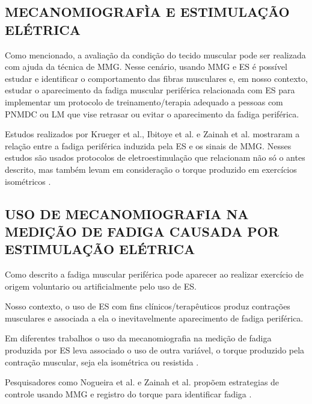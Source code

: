 \subsection{MECANOMIOGRAFÌA E ESTIMULAÇÃO ELÉTRICA}
Como mencionado, a avaliação da condição do tecido muscular pode ser realizada com ajuda da técnica de \acrshort{MMG}. Nesse cenário, usando \acrshort{MMG} e \acrshort{ES} é possível estudar e identificar o comportamento das fibras musculares \cite{Krueger2014AdvancesMechanomyography} e, em nosso contexto, estudar o aparecimento da fadiga muscular periférica relacionada com \acrshort{ES} para implementar um protocolo de treinamento/terapia adequado a pessoas com \acrshort{PNMDC} ou \acrshort{LM} que vise retrasar ou evitar o aparecimento da fadiga periférica. 

Estudos realizados por Krueger et al., Ibitoye et al. e Zainah et al. mostraram a relação entre a fadiga periférica induzida pela \acrshort{ES} e os sinais de \acrshort{MMG}. Nesses estudos são usados protocolos de eletroestimulação que relacionam não só o antes descrito, mas também levam em consideração o torque produzido em exercícios isométricos \cite{Krueger2014AdvancesMechanomyography, Zainah2017MechanomyographyInjury, Ibitoye2014MechanomyographyProspects}. 

\subsection{USO DE MECANOMIOGRAFIA NA MEDIÇÃO DE FADIGA CAUSADA POR ESTIMULAÇÃO ELÉTRICA}
Como descrito a fadiga muscular periférica pode aparecer ao realizar exercício de origem voluntario ou artificialmente pelo uso de \acrshort{ES}.

Nosso contexto, o uso de \acrshort{ES} com fins clínicos/terapêuticos produz contrações musculares e associada a ela o inevitavelmente aparecimento de fadiga periférica.

Em diferentes trabalhos o uso da mecanomiografia na medição de fadiga produzida por \acrshort{ES} leva associado o uso de outra variável, o torque produzido pela contração muscular, seja ela isométrica ou resistida \cite{Madeleine2001MechanomyographyContractions, Zainah2017MechanomyographyInjury, Ibitoye2014MechanomyographyProspects, NogueiraNeto2013ViabilidadeNeuromuscular}.

Pesquisadores como Nogueira et al. e Zainah et al. propõem estrategias de controle usando \acrshort{MMG} e registro do torque para identificar fadiga \cite{Zainah2017MechanomyographyInjury, NogueiraNeto2013ViabilidadeNeuromuscular}. 


